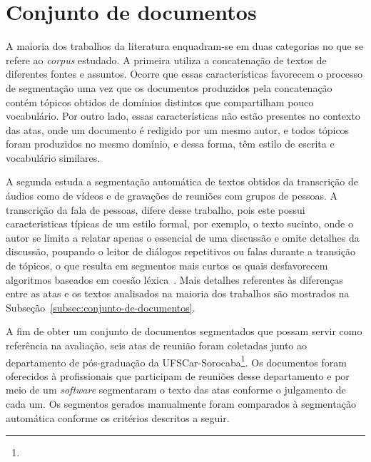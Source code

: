 
\section{Conjunto de documentos}
	\label{sec:conjutodedocumentos} 
 
A maioria dos trabalhos da literatura enquadram-se em duas categorias no que se refere ao \textit{corpus} estudado. A primeira utiliza a concatenação de textos de diferentes fontes e assuntos. 
Ocorre que essas características favorecem o processo de segmentação uma vez que os documentos produzidos pela concatenação contém tópicos obtidos de domínios distintos que compartilham pouco vocabulário. Por outro lado, essas características não estão presentes no contexto das atas, onde um documento é redigido por um mesmo autor, e todos tópicos foram produzidos no mesmo domínio, e dessa forma, têm estilo de escrita e vocabulário similares.


A segunda estuda a segmentação automática de textos obtidos da transcrição de áudios como de vídeos e de gravações de reuniões com grupos de pessoas. 
A transcrição da fala de pessoas, difere desse trabalho, pois este possui caracteristicas típicas de um estilo formal, por exemplo, o texto sucinto, onde o autor se limita a relatar apenas o essencial de uma discussão e omite detalhes da discussão, poupando o leitor de diálogos repetitivos ou falas durante a transição de tópicos, o que resulta em segmentos mais curtos os quais desfavorecem algoritmos baseados em coesão léxica~\cite{Choi2000}. 
Mais detalhes referentes às diferenças entre as atas e os textos analisados na maioria dos trabalhos são mostrados na Subseção~\ref{subsec:conjunto-de-documentos}.




	A fim de obter um conjunto de documentos segmentados que possam servir como referência na avaliação, seis atas de reunião foram coletadas junto ao departamento de pós-graduação da UFSCar-Sorocaba\footnote{\urlatas}. Os documentos foram oferecidos à profissionais que participam de reuniões desse departamento e por meio de um \textit{software} segmentaram o texto das atas conforme o julgamento de cada um. Os segmentos gerados manualmente foram comparados à segmentação automática conforme os critérios descritos a seguir.
	
